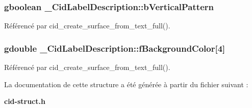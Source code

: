 \subsubsection{\setlength{\rightskip}{0pt plus 5cm}gboolean {\bf \_\-CidLabelDescription::bVerticalPattern}}\label{struct__CidLabelDescription_4dd4a8cf5a49bb45476fd887ad22162a}




Référencé par cid\_\-create\_\-surface\_\-from\_\-text\_\-full().
\subsubsection{\setlength{\rightskip}{0pt plus 5cm}gdouble {\bf \_\-CidLabelDescription::fBackgroundColor}[4]}\label{struct__CidLabelDescription_d4f15e4ba98dc54aa5f1ab739645148b}




Référencé par cid\_\-create\_\-surface\_\-from\_\-text\_\-full().

La documentation de cette structure a été générée à partir du fichier suivant :\begin{CompactItemize}
\item 
{\bf cid-struct.h}\end{CompactItemize}
